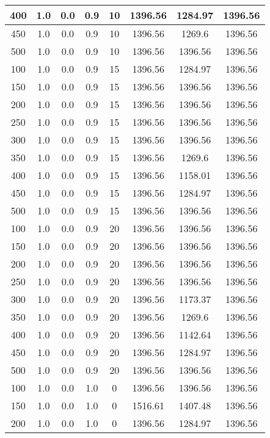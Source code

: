 \documentclass[a4paper, 12pt]{extreport}
\begin{document}
\begin{itemize}
\begin{longtable}{|c|c|c|c|c|c|c|c|}
			400 & 1.0 & 0.0 & 0.9 & 10 & 1396.56 & 1284.97 & 1396.56 \\\hline
			450 & 1.0 & 0.0 & 0.9 & 10 & 1396.56 & 1269.6 & 1396.56 \\\hline
			500 & 1.0 & 0.0 & 0.9 & 10 & 1396.56 & 1396.56 & 1396.56 \\\hline
			100 & 1.0 & 0.0 & 0.9 & 15 & 1396.56 & 1284.97 & 1396.56 \\\hline
			150 & 1.0 & 0.0 & 0.9 & 15 & 1396.56 & 1396.56 & 1396.56 \\\hline
			200 & 1.0 & 0.0 & 0.9 & 15 & 1396.56 & 1396.56 & 1396.56 \\\hline
			250 & 1.0 & 0.0 & 0.9 & 15 & 1396.56 & 1396.56 & 1396.56 \\\hline
			300 & 1.0 & 0.0 & 0.9 & 15 & 1396.56 & 1396.56 & 1396.56 \\\hline
			350 & 1.0 & 0.0 & 0.9 & 15 & 1396.56 & 1269.6 & 1396.56 \\\hline
			400 & 1.0 & 0.0 & 0.9 & 15 & 1396.56 & 1158.01 & 1396.56 \\\hline
			450 & 1.0 & 0.0 & 0.9 & 15 & 1396.56 & 1284.97 & 1396.56 \\\hline
			500 & 1.0 & 0.0 & 0.9 & 15 & 1396.56 & 1396.56 & 1396.56 \\\hline
			100 & 1.0 & 0.0 & 0.9 & 20 & 1396.56 & 1396.56 & 1396.56 \\\hline
			150 & 1.0 & 0.0 & 0.9 & 20 & 1396.56 & 1396.56 & 1396.56 \\\hline
			200 & 1.0 & 0.0 & 0.9 & 20 & 1396.56 & 1396.56 & 1396.56 \\\hline
			250 & 1.0 & 0.0 & 0.9 & 20 & 1396.56 & 1396.56 & 1396.56 \\\hline
			300 & 1.0 & 0.0 & 0.9 & 20 & 1396.56 & 1173.37 & 1396.56 \\\hline
			350 & 1.0 & 0.0 & 0.9 & 20 & 1396.56 & 1269.6 & 1396.56 \\\hline
			400 & 1.0 & 0.0 & 0.9 & 20 & 1396.56 & 1142.64 & 1396.56 \\\hline
			450 & 1.0 & 0.0 & 0.9 & 20 & 1396.56 & 1284.97 & 1396.56 \\\hline
			500 & 1.0 & 0.0 & 0.9 & 20 & 1396.56 & 1396.56 & 1396.56 \\\hline
			100 & 1.0 & 0.0 & 1.0 & 0 & 1396.56 & 1396.56 & 1396.56 \\\hline
			150 & 1.0 & 0.0 & 1.0 & 0 & 1516.61 & 1407.48 & 1396.56 \\\hline
			200 & 1.0 & 0.0 & 1.0 & 0 & 1396.56 & 1284.97 & 1396.56 \\\hline

\end{longtable}
\end{itemize}
\end{document}
